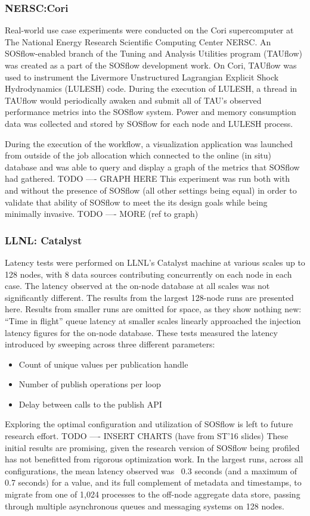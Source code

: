 \subsubsection{NERSC:Cori} %
Real-world use case experiments were conducted on the Cori
supercomputer at The National Energy Research Scientific Computing
Center NERSC.
%
An SOSflow-enabled branch of the Tuning and Analysis Utilities program
(TAUflow) was created as a part of the SOSflow development work.
%
On Cori, TAUflow was used to instrument the Livermore Unstructured
Lagrangian Explicit Shock Hydrodynamics (LULESH) code.
%
During the execution of LULESH, a thread in TAUflow would periodically
awaken and submit all of TAU's observed performance metrics into the
SOSflow system.
%
Power and memory consumption data was collected and stored by SOSflow
for each node and LULESH process.
%
\par
%
During the execution of the workflow, a visualization application was
launched from outside of the job allocation which connected to the
online (in situ) database and was able to query and display a
graph of the metrics that SOSflow had gathered.
%
TODO ---- GRAPH HERE
%
This experiment was run both with and without the presence of SOSflow
(all other settings being equal) in order to validate that ability of
SOSflow to meet the its design goals while being minimally invasive.
%
TODO ---- MORE (ref to graph)
%
%
\subsubsection{LLNL: Catalyst} %
Latency tests were performed on LLNL's Catalyst machine at
various scales up to 128 nodes, with 8 data sources contributing
concurrently on each node in each case.
%
The latency observed at the on-node database at all
scales was not significantly different.
%
The results from the largest 128-node runs are presented here.
%
Results from smaller runs are omitted for space, as they show nothing
new: ``Time in flight'' queue latency at smaller scales linearly
approached the injection latency figures for the on-node database.
%
These tests measured the latency introduced by sweeping across three
different parameters:
\begin{itemize}
\item Count of unique values per publication handle
\item Number of publish operations per loop
\item Delay between calls to the publish API
\end{itemize}
%
Exploring the optimal configuration and utilization of SOSflow is left
to future research effort.
%
TODO ---- INSERT CHARTS (have from ST'16 slides)
%
These initial results are promising, given the research version of SOSflow
being profiled has not benefitted from rigorous optimization work.
%
In the largest runs, across all configurations, the mean latency
observed was ~0.3 seconds (and a maximum of 0.7 seconds) for a value,
and its full complement of metadata and timestamps, to migrate from
one of 1,024 processes to the off-node aggregate data store, passing
through multiple asynchronous queues and messaging systems on 128
nodes.
%
%
